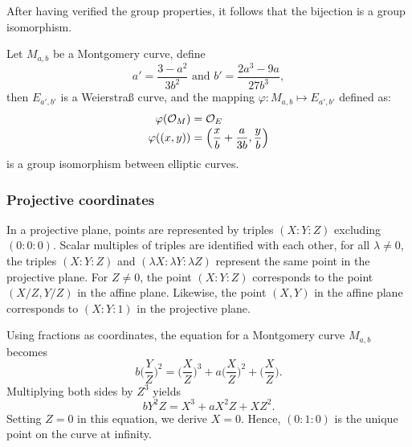 After having verified the group properties, it follows that the bijection is a group isomorphism.
\begin{lemma}
  \label{lemma:bij-ecc}
  Let $M_{a,b}$ be a Montgomery curve, define
  \vspace{-0.3em}
  $$a' = \frac{3-a^2}{3b^2} \text{\ \ \ \ and\ \ \ \ } b' = \frac{2a^3 - 9a}{27b^3},$$
  then $E_{a',b'}$ is a Weierstra{\ss} curve, and the mapping
  $\varphi : M_{a,b} \mapsto E_{a',b'}$ defined as:
  \vspace{-0.5em}
  \begin{align*}
    \varphi(\mathcal{O}_M)   & = \mathcal{O}_E                                                 \\[-0.5ex]
    \varphi( (x , y) ) & = \left( \frac{x}{b} + \frac{a}{3b} , \frac{y}{b} \right)
  \end{align*}
  is a group isomorphism between elliptic curves.
\end{lemma}



\subsubsection{Projective coordinates}
\label{subsec:ECC-projective}

In a projective plane, points are represented by triples $(X:Y:Z)$ excluding $(0:0:0)$.
Scalar multiples of triples are identified with each other, \ie
for all $\lambda \neq 0$, the triples $(X:Y:Z)$ and $(\lambda X:\lambda Y:\lambda Z)$ represent
the same point in the projective plane.
For $Z\neq 0$, the point $(X:Y:Z)$ corresponds to the
point $(X/Z,Y/Z)$ in the affine plane.
Likewise, the point $(X,Y)$ in the affine plane corresponds to $(X:Y:1)$ in the projective plane.

Using fractions as coordinates, the equation for a Montgomery curve $M_{a,b}$
becomes
$$b \bigg(\frac{Y}{Z}\bigg)^2 = \bigg(\frac{X}{Z}\bigg)^3 + a \bigg(\frac{X}{Z}\bigg)^2 + \bigg(\frac{X}{Z}\bigg).$$
Multiplying both sides by $Z^3$ yields
$$b Y^2Z = X^3 + a X^2Z + XZ^2.$$
Setting $Z = 0$ in this equation, we derive $X = 0$.
Hence, $(0 : 1 : 0)$ is the unique point on the curve at infinity.

